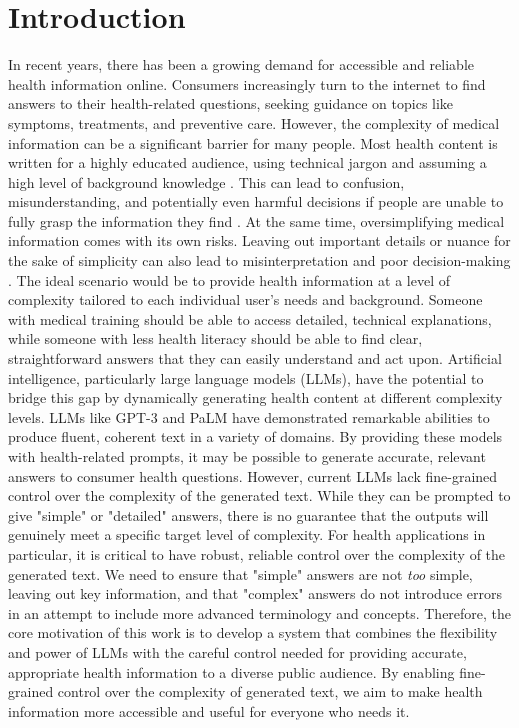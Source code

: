 \chapter{Introduction}
\label{c1}

In recent years, there has been a growing demand for accessible and reliable health information online.
Consumers increasingly turn to the internet to find answers to their health-related questions, seeking guidance on topics like symptoms, treatments, and preventive care.
However, the complexity of medical information can be a significant barrier for many people.
Most health content is written for a highly educated audience, using technical jargon and assuming a high level of background knowledge \cite{clarke2016readability,storm2020assessing}.
This can lead to confusion, misunderstanding, and potentially even harmful decisions if people are unable to fully grasp the information they find \cite{charow2019readability}.
At the same time, oversimplifying medical information comes with its own risks.
Leaving out important details or nuance for the sake of simplicity can also lead to misinterpretation and poor decision-making \cite{clark2011simplifying}.
The ideal scenario would be to provide health information at a level of complexity tailored to each individual user's needs and background.
Someone with medical training should be able to access detailed, technical explanations, while someone with less health literacy should be able to find clear, straightforward answers that they can easily understand and act upon.
Artificial intelligence, particularly large language models (LLMs), have the potential to bridge this gap by dynamically generating health content at different complexity levels.
LLMs like GPT-3 \cite{brown2020languagemodelsfewshotlearners} and PaLM \cite{chowdhery2022palmscalinglanguagemodeling} have demonstrated remarkable abilities to produce fluent, coherent text in a variety of domains.
By providing these models with health-related prompts, it may be possible to generate accurate, relevant answers to consumer health questions.
However, current LLMs lack fine-grained control over the complexity of the generated text.
While they can be prompted to give "simple" or "detailed" answers, there is no guarantee that the outputs will genuinely meet a specific target level of complexity.
For health applications in particular, it is critical to have robust, reliable control over the complexity of the generated text.
We need to ensure that "simple" answers are not \textit{too} simple, leaving out key information, and that "complex" answers do not introduce errors in an attempt to include more advanced terminology and concepts.
Therefore, the core motivation of this work is to develop a system that combines the flexibility and power of LLMs with the careful control needed for providing accurate, appropriate health information to a diverse public audience.
By enabling fine-grained control over the complexity of generated text, we aim to make health information more accessible and useful for everyone who needs it.

